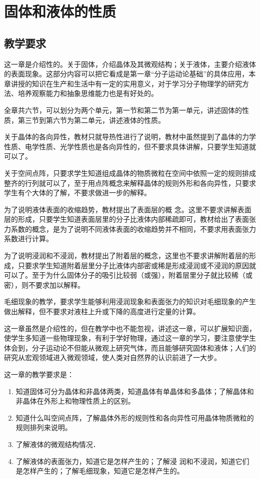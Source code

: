 \chapter{固体和液体的性质}

\minitoc[n]
\section{教学要求}


这一章是介绍性的。关于固体，介绍晶体及其微观结构；关于液体，主要介绍液体的表面现象。这部分内容可以把它看成是第一章“分子运动论基础”的具体应用，本章讲授的知识在生产和生活中有一定的实用意义，对于学习分子物理学的研究方法、培养观察能力和抽象思维能力也是有好处的。

全章共六节，可以划分为两个单元，第一节和第二节为第一单元，讲述固体的性质，第三节到第六节为第二单元，讲述液体的性质。

关于晶体的各向异性，教材只就导热性进行了说明，教材中虽然提到了晶体的力学性质、电学性质、光学性质也是各向异性的，但不要求具体讲解，只要学生知道就可以了。

关于空间点阵，只要求学生知道组成晶体的物质微粒在空间中依照一定的规则排成整齐的行列就可以了，至于用点阵概念来解释晶体的规则外形和各向异性，只要求学生有个大体的了解，不要求做进一步的解释。

为了说明液体表面的收缩趋势，教材提出了表面层的概
念。这里不要求讲解表面层的形成，只要学生知道表面层里的分子比液体内部稀疏即可，教材给出了表面张力系数的概念，是为了说明不同液体表面的收缩趋势并不相同，不要求用表面张力系数进行计算。

为了说明浸润和不浸润，教材提出了附着层的概念，这里也不要求讲解附着层的形成，只要求学生知道附着层里分子比液体内部密或稀是形成浸润或不浸润的原因就可以了。至于为什么固体分子的吸引比较弱（或强），附着层里分子就比较稀（或密），则不要求加以解释。

毛细现象的教学，要求学生能够利用浸润现象和表面张力的知识对毛细现象的产生做出解释，但不要求对液柱上升或下降的高度进行定量的计算。

这一章虽然是介绍性的，但在教学中也不能忽视，讲述这一章，可以扩展知识面，使学生多知道一些物理现象，有利于学好物理，通过这一章的学习，要注意使学生体会到，分子运动论不但能从微观上研究气体，而且能够研究固体和液体；人们的研究从宏观领域进入微观领域，使人类对自然界的认识前进了一大步。

这一章的教学要求是：
\begin{enumerate}
\item 知道固体可分为晶体和非晶体两类，知道晶体有单晶体和多晶体；了解晶体和非晶体在外形上和物理性质上的区别。
\item 知道什么叫空间点阵，了解晶体外形的规则性和各向异性可用晶体物质微粒的规则排列来说明。
\item 了解液体的微观结构情况．
\item 了解液体的表面张力，知道它是怎样产生的；了解浸
润和不浸润，知道它们是怎样产生的；了解毛细现象，知道它是怎样产生的。
\end{enumerate}


